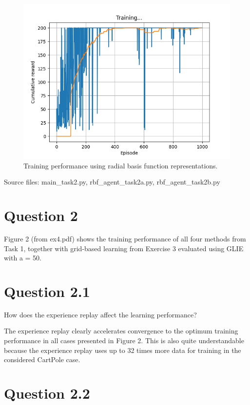 \documentclass[12pt]{article}
\begin{document}
\begin{figure}[h] 
	\centering  %
    \includegraphics[width=0.9\columnwidth]{img/Figure_4_task_2b_cumulative_reward.png}
	\caption{Training performance using radial basis function representations.}
	\label{fig:fig4}
\end{figure}

\noindent
Source files: main\_task2.py, rbf\_agent\_task2a.py, rbf\_agent\_task2b.py 


\section*{Question 2}

Figure 2 (from ex4.pdf) shows the training performance of all four methods from Task 1, together
with grid-based learning from Exercise 3 evaluated using GLIE with a = 50.

\section*{Question 2.1}

How does the experience replay affect the learning performance?
\newline 

The experience replay clearly accelerates convergence to the optimum training performance in all cases presented in Figure 2. This is also quite understandable because the experience replay uses up to 32 times more data for training in the considered CartPole case. 


\section*{Question 2.2}
\end{document}
